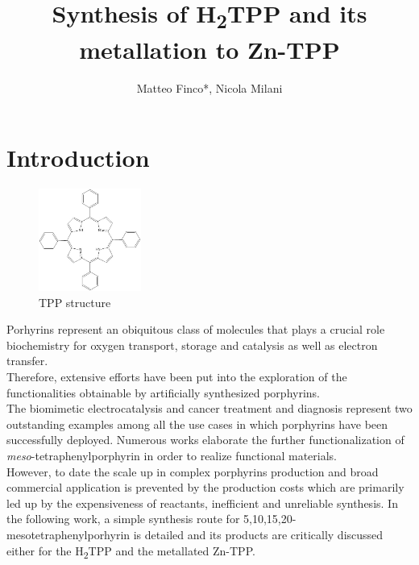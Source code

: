 \documentclass[num-refs]{wiley-article}
\title{Synthesis of \texorpdfstring{H\textsubscript{2}}-TPP and its metallation to Zn-TPP}
\author[1\authfn{1}]{Matteo Finco*, Nicola Milani}
\affil[1]{DiSC, Università degli Studi di Padova, Padova, Italy, 35131, Italy}
\begin{document}
\begin{frontmatter}
\maketitle

\begin{abstract}

\end{abstract}

\end{frontmatter}

\section{Introduction}
\begin{figure}
    \includegraphics[width=0.3\textwidth]{TPP}
    \caption{TPP structure}
    \label{TPP-structure}
\end{figure}
Porhyrins represent an obiquitous class of molecules that plays a crucial role biochemistry for oxygen transport\citep{hardison_evolution_2012}, storage\citep{kendrew_three-dimensional_1958} and catalysis as well as electron transfer\citep{keilin_cytochrome_1925}.\\
Therefore, extensive efforts have been put into the exploration of the functionalities obtainable by artificially synthesized porphyrins.\\
The biomimetic electrocatalysis\cite{facchin_oxygen_2021,liang_porphyrin-based_2021} and cancer treatment and diagnosis\cite{wang_recent_2021} represent two outstanding examples among all the use cases in which porphyrins have been successfully deployed.
Numerous works elaborate the further functionalization of \textit{meso}-tetraphenylporphyrin\cite{silva_porphyrins_2006} in order to realize functional materials. \\
However, to date the scale up in complex porphyrins production and broad commercial application is prevented by the production costs which are primarily led up by the expensiveness of reactants, inefficient and unreliable synthesis.
In the following work, a simple synthesis route for 5,10,15,20-mesotetraphenylporhyrin is detailed and its products are critically discussed either for the \texorpdfstring{H\textsubscript{2}}-TPP and the metallated Zn-TPP.
\newpage
\end{document}
